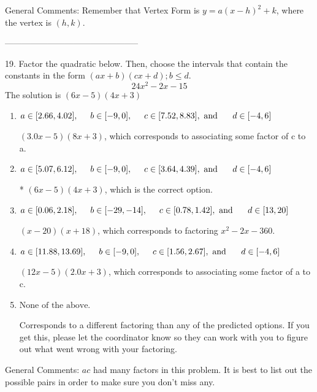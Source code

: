 \documentclass{article}[14pt]
\begin{document}
General Comments: Remember that Vertex Form is $y = a(x-h)^2+k$, where the vertex is $(h, k)$.

-----------------------------------------------

19. Factor the quadratic below. Then, choose the intervals that contain the constants in the form $(ax+b)(cx+d); b \leq d.$
$$ 24x^{2} -2 x -15 $$ 
The solution is $ (6x -5)(4x + 3) $ 

\begin{enumerate}[label=\Alph*.] 
\item $ a \in [2.66, 4.02], \hspace*{5mm} b \in [-9, 0], \hspace*{5mm} c \in [7.52, 8.83], \text{ and } \hspace*{5mm} d \in [-4, 6] $ 

  $(3.0x -5)(8x + 3)$, which corresponds to associating some factor of c to a. 
\item $ a \in [5.07, 6.12], \hspace*{5mm} b \in [-9, 0], \hspace*{5mm} c \in [3.64, 4.39], \text{ and } \hspace*{5mm} d \in [-4, 6] $ 

 * $(6x -5)(4x + 3)$, which is the correct option. 
\item $ a \in [0.06, 2.18], \hspace*{5mm} b \in [-29, -14], \hspace*{5mm} c \in [0.78, 1.42], \text{ and } \hspace*{5mm} d \in [13, 20] $ 

  $(x -20)(x + 18)$, which corresponds to factoring $x^{2} -2 x -360$. 
\item $ a \in [11.88, 13.69], \hspace*{5mm} b \in [-9, 0], \hspace*{5mm} c \in [1.56, 2.67], \text{ and } \hspace*{5mm} d \in [-4, 6] $ 

  $(12x -5)(2.0x + 3)$, which corresponds to associating some factor of a to c. 
\item $ \text{None of the above.} $ 

  Corresponds to a different factoring than any of the predicted options. If you get this, please let the coordinator know so they can work with you to figure out what went wrong with your factoring. 
\end{enumerate} 
 
General Comments: $ac$ had many factors in this problem. It is best to list out the possible pairs in order to make sure you don't miss any.
\end{document}
